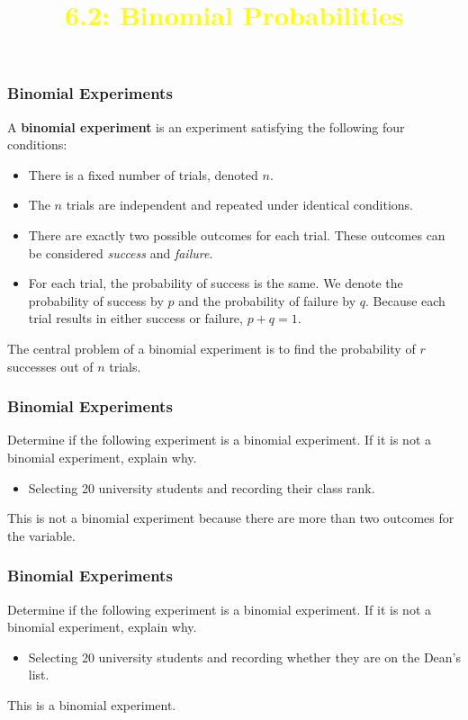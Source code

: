 \documentclass{beamer}
\title{\textcolor{yellow}{6.2: Binomial Probabilities}} %
\date{}
\theoremstyle{definition}
\begin{document}
\frame{\titlepage}


\begin{frame}
\frametitle{Binomial Experiments}\pause
\begin{definition}
A \textbf{binomial experiment} is an experiment satisfying the following four conditions:
\begin{itemize}
\item There is a fixed number of trials, denoted $n$.\pause
\item The $n$ trials are independent and repeated under identical conditions.\pause
\item There are exactly two possible outcomes for each trial.  These outcomes can be considered \emph{success} and \emph{failure}.\pause
\item For each trial, the probability of success is the same.  We denote the probability of success by $p$ and the probability of failure by $q$.  Because each trial results in either success or failure, $p+q=1$. 
\end{itemize}\pause
The central problem of a binomial experiment is to find the probability of $r$ successes out of $n$ trials.
\end{definition}
\end{frame}

\begin{frame}
\frametitle{Binomial Experiments}\pause
\begin{example}
Determine if the following experiment  is a binomial experiment.  If it is not a binomial experiment, explain why.
\begin{itemize}
\item Selecting 20 university students and recording their class rank.
\end{itemize}
\end{example}\pause
This is not a binomial experiment because there are more than two outcomes for the variable.
\vspace*{3in}
\end{frame}

\begin{frame}
\frametitle{Binomial Experiments}
\begin{example}
Determine if the following experiment  is a binomial experiment.  If it is not a binomial experiment, explain why.
\begin{itemize}
\item Selecting 20 university students and recording whether they are on the Dean's list.
\end{itemize}
\end{example}\pause
This is a binomial experiment.
\vspace*{3in}
\end{frame}
\end{document}

